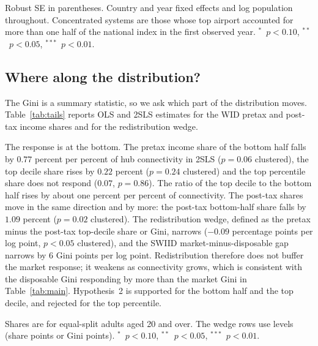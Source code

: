 \documentclass[12pt]{article}
\newcommand{\sym}[1]{\ensuremath{^{#1}}}
\begin{document}
\begin{table}[H]\centering\caption{Network concentration and inequality.}\label{tab:conc}
\begin{threeparttable}\small
\begin{tablenotes}\footnotesize\item Robust SE in parentheses. Country and year fixed effects and log population throughout. Concentrated systems are those whose top airport accounted for more than one half of the national index in the first observed year. \sym{*}~$p<0.10$, \sym{**}~$p<0.05$, \sym{***}~$p<0.01$.\end{tablenotes}\end{threeparttable}\end{table}

\subsection{Where along the distribution?}
\label{sec:tails}
The Gini is a summary statistic, so we ask which part of the distribution moves. Table~\ref{tab:tails} reports OLS and 2SLS estimates for the WID pretax and post-tax income shares and for the redistribution wedge.

The response is at the bottom. The pretax income share of the bottom half falls by $0.77$ percent per percent of hub connectivity in 2SLS ($p=0.06$ clustered), the top decile share rises by $0.22$ percent ($p=0.24$ clustered) and the top percentile share does not respond ($0.07$, $p=0.86$). The ratio of the top decile to the bottom half rises by about one percent per percent of connectivity. The post-tax shares move in the same direction and by more: the post-tax bottom-half share falls by $1.09$ percent ($p=0.02$ clustered). The redistribution wedge, defined as the pretax minus the post-tax top-decile share or Gini, narrows ($-0.09$ percentage points per log point, $p<0.05$ clustered), and the SWIID market-minus-disposable gap narrows by $6$ Gini points per log point. Redistribution therefore does not buffer the market response; it weakens as connectivity grows, which is consistent with the disposable Gini responding by more than the market Gini in Table~\ref{tab:main}. Hypothesis~2 is supported for the bottom half and the top decile, and rejected for the top percentile.

\begin{table}[H]\centering\caption{Distributional location: WID income shares and the redistribution wedge (hub connectivity, Feyrer instrument).}\label{tab:tails}
\begin{threeparttable}\small
\begin{tablenotes}\footnotesize\item Shares are for equal-split adults aged 20 and over. The wedge rows use levels (share points or Gini points). \sym{*}~$p<0.10$, \sym{**}~$p<0.05$, \sym{***}~$p<0.01$.\end{tablenotes}\end{threeparttable}\end{table}
\end{document}
